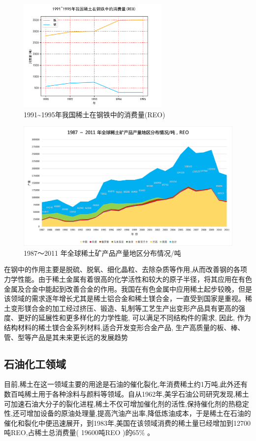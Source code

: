 \documentclass[twoside,twocolumn]{article}
\begin{document}
\begin{figure}[h]
   \centering
   \includegraphics[width = 20em]{figure3.png}
   \caption{1991\~{}1995年我国稀土在钢铁中的消费量(REO)\cite{RN3}}
 \end{figure}

\begin{figure}[h]
  \centering
  \includegraphics[width = 40em]{figure5.png}
  \caption{1987～2011 年全球稀土矿产品产量地区分布情况/吨\cite{RN6}}
\end{figure}

在钢中的作用主要是脱硫、脱氧、细化晶粒、去除杂质等作用,从而改善钢的各项力学性能。由于稀土金属有着很高的化学活性和较大的原子半径，将其应用在有色金属及合金中能起到改善合金的作用。我国在有色金属中应用稀土起步较晚，但是该领域的需求逐年增长尤其是稀土铝合金和稀土镁合金，一直受到国家是重视。稀土变形镁合金的加工经过挤压、锻造、轧制等工艺生产出变形产品具有更高的强度、更好的延展性和更多样化的力学性能, 可以满足不同结构件的需求, 因此, 作为结构材料的稀土镁合金系列材料,适合开发变形合金产品, 生产高质量的板、棒、管、型等产品是其未来更长远的发展趋势\cite{RN52}

\subsection{石油化工领域}
目前,稀土在这一领域主要的用途是石油的催化裂化,年消费稀土约1万吨,此外还有数百吨稀土用于各种涂料与颜料等领域。自从1962年,美孚石油公司研究发现,稀土可加速石油大分子的裂化进程,稀土不仅可增加催化剂的活性,保持催化剂的热稳定性,还可增加设备的原油处理量,提高汽油产出率,降低炼油成本，于是稀土在石油的催化和裂化中便迅速展开，到1983年,美国在该领域消费的稀土量已经增加到12700吨REO,占稀土总消费量( 19600吨REO )的65$\%$ 。\cite{RN2}
\end{document}
